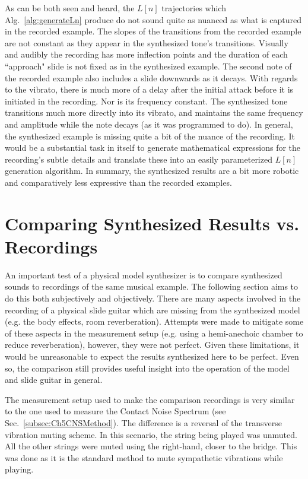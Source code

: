 \documentclass[../main.tex]{subfiles}
\begin{document}
As can be both seen and heard, the $L[n]$ trajectories which Alg.~\ref{alg:generateLn} produce do not sound quite as nuanced as what is captured in the recorded example. The slopes of the transitions from the recorded example are not constant as they appear in the synthesized tone's transitions. Visually and audibly the recording has more inflection points and the duration of each ``approach" slide is not fixed as in the synthesized example. The second note of the recorded example also includes a slide downwards as it decays. With regards to the vibrato, there is much more of a delay after the initial attack before it is initiated in the recording. Nor is its frequency constant. The synthesized tone transitions much more directly into its vibrato, and maintains the same frequency and amplitude while the note decays (as it was programmed to do). In general, the synthesized example is missing quite a bit of the nuance of the recording. It would be a substantial task in itself to generate mathematical expressions for the recording's subtle details and translate these into an easily parameterized $L[n]$ generation algorithm. In summary, the synthesized results are a bit more robotic and comparatively less expressive than the recorded examples.

\section{Comparing Synthesized Results vs. Recordings}
An important test of a physical model synthesizer is to compare synthesized sounds to recordings of the same musical example. The following section aims to do this both subjectively and objectively. There are many aspects involved in the recording of a physical slide guitar which are missing from the synthesized model (e.g. the body effects, room reverberation). Attempts were made to mitigate some of these aspects in the measurement setup (e.g. using a hemi-anechoic chamber to reduce reverberation), however, they were not perfect. Given these limitations, it would be unreasonable to expect the results synthesized here to be perfect. Even so, the comparison still provides useful insight into the operation of the model and slide guitar in general.

The measurement setup used to make the comparison recordings is very similar to the one used to measure the Contact Noise Spectrum (see Sec.~\ref{subsec:Ch5CNSMethod}). The difference is a reversal of the transverse vibration muting scheme. In this scenario, the string being played was unmuted. All the other strings were muted using the right-hand, closer to the bridge. This was done as it is the standard method to mute sympathetic vibrations while playing.
\end{document}
